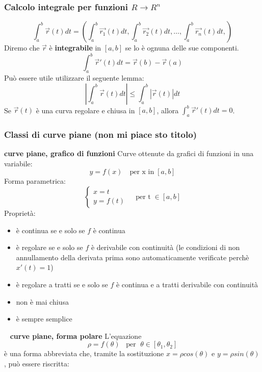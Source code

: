 \subsubsection{Calcolo integrale per funzioni $R \rightarrow R^n$}
\[
    \int_{a}^{b} \vec{r}(t) dt =\left( \int_{a}^{b}\vec{r_1}(t) dt,\int_{a}^{b}\vec{r_2}(t) dt, \dots, \int_{a}^{b}\vec{r_n}(t) dt,\right)
\]
Diremo che $\vec{r}$ è \textbf{integrabile} in $[a,b]$ se lo è ognuna delle sue componenti.\newline
\[
    \int_{a}^{b} \vec{r}'(t) dt = \vec{r}(b) - \vec{r}(a)
\]
Può essere utile utilizzare il seguente lemma:
\[
    \left| \int_{a}^{b}\vec{r}(t)dt \right| \leq \int_{a}^{b}|\vec{r}(t)|dt
\]
Se $\vec{r}(t)$ è una curva regolare e chiusa in $[a,b]$, allora $\int_{a}^{b}\vec{r}'(t) dt =0$.\newline
\subsubsection{Classi di curve piane (non mi piace sto titolo)}
\textbf{curve piane, grafico di funzioni}\newline
\newline
Curve ottenute da grafici di funzioni in una variabile:
\[
    y = f(x) \quad\text{per x in} \;[a,b]
\]
Forma parametrica:
\[
    \begin{cases}
        x=t \\
        y=f(t)
    \end{cases} \;\;\;\; \text{per t} \;\in[a,b]
\]
Proprietà:
\begin{itemize}
    \item è continua se e solo se $f$ è continua
    \item è regolare se e solo se $f$ è derivabile con continuità (le condizioni di non annullamento della derivata prima sono automaticamente verificate perchè $x'(t) = 1$)
    \item è regolare a tratti se e solo se $f$ è continua e a tratti derivabile con continuità
    \item non è mai chiusa
    \item è sempre semplice
\end{itemize}
\ \newline
\textbf{curve piane, forma polare}\newline
\newline
L'equazione
\[
    \rho = f(\theta) \;\;\;\text{per } \; \theta \in [\theta_1, \theta_2]
\]
è una forma abbreviata che, tramite la sostituzione $x= \rho cos(\theta)$ e $y= \rho sin(\theta)$, può essere riscritta:
